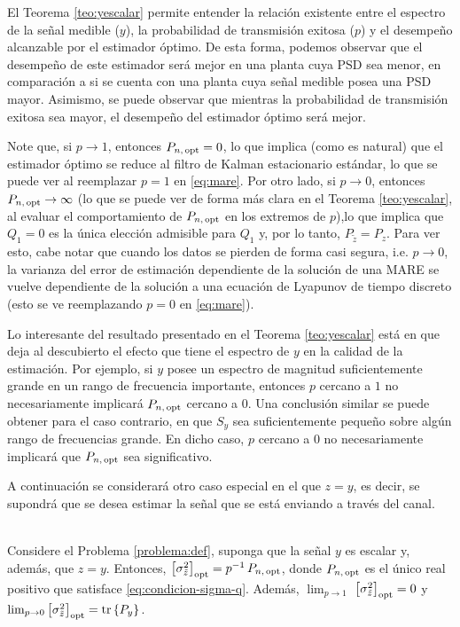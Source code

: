 El Teorema \ref{teo:yescalar} permite entender la relaci\'on existente entre el espectro de la se\~nal medible ($y$), la probabilidad de transmisi\'on exitosa ($p$) y el desempe\~no alcanzable por el estimador \'optimo. De esta forma, podemos observar que el desempe\~no de este estimador ser\'a mejor en una planta cuya PSD sea menor, en comparaci\'on a si se cuenta con una planta cuya se\~nal medible posea una PSD mayor. Asimismo, se puede observar que mientras la probabilidad de transmisi\'on exitosa sea mayor, el desempe\~no del estimador \'optimo ser\'a mejor.

\begin{obs}
Note que, si $p\rightarrow 1$, entonces $P_{n, \,\operatorname{opt}}=0$, lo que implica (como es natural) que el estimador \'optimo se reduce al filtro de Kalman estacionario est\'andar, lo que se puede ver al reemplazar $p=1$ en \eqref{eq:mare}. Por otro lado, si $p\rightarrow 0$, entonces $P_{n, \,\operatorname{opt}}\rightarrow \infty$ (lo que se puede ver de forma más clara en el Teorema \ref{teo:yescalar}, al evaluar el comportamiento de $P_{n,\,\operatorname{opt}}$ en los extremos de $p$),lo que implica que $Q_1=0$ es la \'unica elecci\'on admisible para $Q_1$ y, por lo tanto, $P_{\tilde{z}}=P_{z}$. Para ver esto, cabe notar que cuando los datos se pierden de forma casi segura, i.e. $p\rightarrow 0$, la varianza del error de estimaci\'on dependiente de la soluci\'on de una MARE se vuelve dependiente de la soluci\'on a una ecuaci\'on de Lyapunov de tiempo discreto (esto se ve reemplazando $p=0$ en \eqref{eq:mare}).
\end{obs}

Lo interesante del resultado presentado en el Teorema \ref{teo:yescalar} est\'a en que deja al descubierto el efecto que tiene el espectro de $y$ en la calidad de la estimaci\'on. Por ejemplo, si $y$ posee un espectro de magnitud suficientemente grande en un rango de frecuencia importante, entonces $p$ cercano a $1$ no necesariamente implicar\'a $P_{n, \,\operatorname{opt}}$ cercano a $0$. Una conclusi\'on similar se puede obtener para el caso contrario, en que $S_y$ sea suficientemente peque\~no sobre alg\'un rango de frecuencias grande. En dicho caso, $p$ cercano a $0$ no necesariamente implicar\'a que $P_{n,\,\operatorname{opt}}$ sea significativo.

A continuaci\'on se considerar\'a otro caso especial en el que $z=y$, es decir, se supondr\'a que se desea estimar la se\~nal que se est\'a enviando a trav\'es del canal.
\begin{coro}\label{coro:z=y}{\ \\}
Considere el Problema \ref{problema:def}, suponga que la se\~nal $y$ es escalar y, adem\'as, que $z=y$. Entonces, $\left[ \sigma_{\tilde{z}}^2 \right]_{\operatorname{opt}} = p^{-1} \, P_{n, \, \operatorname{opt}}$, donde $P_{n, \, \operatorname{opt}}$ es el \'unico real positivo que satisface \eqref{eq:condicion-sigma-q}. Adem\'as, $\lim_{p\to 1}$ $\left[ \sigma_{\tilde{z}}^2 \right]_{\operatorname{opt}} = 0$ y $\lim_{p\to 0} \left[\sigma_{\tilde{z}}^2 \right]_{\operatorname{opt}} = \operatorname{tr}\left\{  P_y  \right\}$.
\end{coro}

